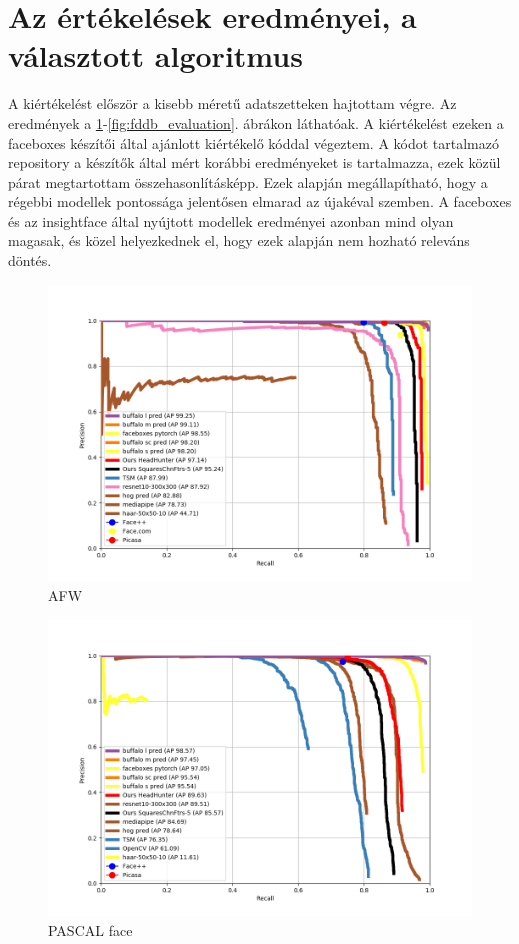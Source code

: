 \section{Az értékelések eredményei, a választott algoritmus}
A kiértékelést először a kisebb méretű adatszetteken hajtottam végre. Az eredmények a \ref{fig:afw_evaluation}-\ref{fig:fddb_evaluation}. ábrákon láthatóak. A kiértékelést ezeken a faceboxes készítői által ajánlott kiértékelő kóddal végeztem. A kódot tartalmazó repository a készítők által mért korábbi eredményeket is tartalmazza, ezek közül párat megtartottam összehasonlításképp. Ezek alapján megállapítható, hogy a régebbi modellek pontossága jelentősen elmarad az újakéval szemben. A faceboxes és az insightface által nyújtott modellek eredményei azonban mind olyan magasak, és közel helyezkednek el, hogy ezek alapján nem hozható releváns döntés.
\begin{figure}
    \centering
    \includegraphics[width=\linewidth]{figures/afw.png}
    \caption{AFW}
    \label{fig:afw_evaluation}
\end{figure}
\begin{figure}
    \centering
    \includegraphics[width=\linewidth]{figures/pascal.png}
    \caption{PASCAL face}
    \label{fig:pascal_evaluation}
\end{figure}
